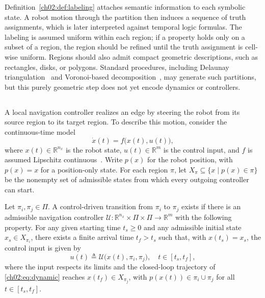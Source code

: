 Definition~\ref{ch02:def:labeling} attaches semantic information to each
symbolic state. A robot motion through the partition then induces a sequence of
truth assignments, which is later interpreted against temporal logic formulas.
The labeling is assumed uniform within each region; if a property holds only on
a subset of a region, the region should be refined until the truth assignment is
cell-wise uniform. Regions should also admit compact geometric descriptions,
such as rectangles, disks, or polygons. Standard procedures, including Delaunay
triangulation~\citep{lee1980two} and Voronoi-based
decomposition~\citep{lavalle2006planning}, may generate such partitions, but
this purely geometric step does not yet encode dynamics or controllers.


\subsection{}
\label{ch02:subsec:robotdynamics}

\begin{revision}
A local navigation controller realizes an edge by steering the robot from
its source region to its target region. To describe this motion, consider
the continuous-time model
\begin{equation}
\dot{x}(t) = f\bigl(x(t),u(t)\bigr),
\label{ch02:eq:dynamic}
\end{equation}
where $x(t)\in\mathbb{R}^{n_x}$ is the robot state, $u(t)\in\mathbb{R}^m$ is the
control input, and $f$ is assumed Lipschitz continuous~\citep{khalil2002nonlinear}.
Write $p(x)$ for the robot position, with $p(x)=x$ for a position-only state.
For each region $\pi$, let $X_\pi\subseteq\{x\mid p(x)\in\pi\}$ be the
nonempty set of admissible states from which every outgoing controller can start.
\end{revision}

\begin{definition}
\label{ch02:def:transition}
\begin{revision}
Let $\pi_i,\pi_j \in \Pi$. A control-driven transition from $\pi_i$ to $\pi_j$
exists if there is an admissible navigation controller
$\mathcal{U} : \mathbb{R}^{n_x} \times \Pi \times \Pi \to \mathbb{R}^{m}$
with the following property. For any given starting time $t_s\geq 0$ and
any admissible initial state $x_s\in X_{\pi_i}$, there exists a finite
arrival time $t_f>t_s$ such that, with $x(t_s)=x_s$, the control input is
given by
\begin{equation}
u(t) \triangleq \mathcal{U}\bigl(x(t),\pi_i,\pi_j\bigr),
\quad t \in [t_s,t_f],
\label{ch02:eq:control}
\end{equation}
where the input respects its limits and the closed-loop trajectory of
\eqref{ch02:eq:dynamic} reaches $x(t_f)\in X_{\pi_j}$, with
$p(x(t))\in\pi_i\cup\pi_j$ for all $t\in[t_s,t_f]$.
\end{revision}
\end{definition}

